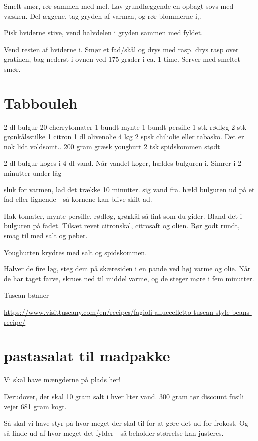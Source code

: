 \documentclass[
]{book}
\begin{document}
Smelt smør, rør sammen med mel. Lav grundlæggende en opbagt
sovs med væsken.
Del æggene, tag gryden af varmen, og rør blommerne i,.

Pisk hviderne stive, vend halvdelen i gryden sammen med fyldet.

Vend resten af hviderne i. Smør et fad/skål
og drys med rasp. drys rasp over gratinen, bag nederst i ovnen
ved 175 grader i ca. 1 time. Server med smeltet smør.

\section{Tabbouleh}\label{tabbouleh}

2 dl bulgur
20 cherrytomater
1 bundt mynte
1 bundt persille
1 stk rødløg
2 stk grønkålsstilke
1 citron
1 dl olivenolie
4 løg
2 spsk chiliolie eller tabasko. Det er nok lidt voldsomt..
200 gram græsk youghurt
2 tsk spidskommen stødt

2 dl bulgur koges i 4 dl vand. Når vandet koger, hældes bulguren i. Simrer i 2 minutter under låg

sluk for varmen, lad det trække 10 minutter. sig vand fra.
hæld bulguren ud på et fad eller lignende - så kornene kan blive skilt ad.

Hak tomater, mynte persille, rødløg, grønkål så fint som du gider. Bland det i bulguren på fadet.
Tilsæt revet citronskal, citrosaft og olien. Rør godt rundt, smag til med salt og peber.

Youghurten krydres med salt og spidskommen.

Halver de fire løg, steg dem på skæresiden i en pande ved høj varme og olie. Når de har taget farve, skrues ned til middel varme, og
de steger møre i fem minutter.

Tuscan bønner

\url{https://www.visittuscany.com/en/recipes/fagioli-alluccelletto-tuscan-style-beans-recipe/}

\section{pastasalat til madpakke}\label{pastasalat-til-madpakke}

Vi skal have mængderne på plads her!

Derudover, der skal 10 gram salt i hver liter vand.
300 gram tør discount fusili vejer
681 gram kogt.

Så skal vi have styr på hvor meget der skal til for at gøre det ud for frokost. Og så
finde ud af hvor meget det fylder - så beholder størrelse kan justeres.
\end{document}
